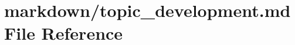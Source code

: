 \hypertarget{topic__development_8md}{}\section{markdown/topic\+\_\+development.md File Reference}
\label{topic__development_8md}
